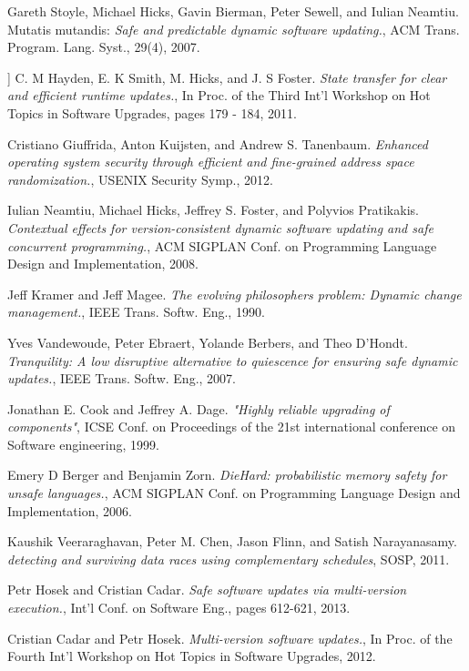 \documentclass[a4paper,11pt,twoside]{report}
\begin{document}
\begin{thebibliography}{1}
   Gareth Stoyle, Michael Hicks, Gavin Bierman, Peter Sewell, and Iulian Neamtiu. Mutatis mutandis: {\em Safe and predictable dynamic software updating.}, ACM Trans. Program. Lang. Syst., 29(4), 2007.
  
   ] C. M Hayden, E. K Smith, M. Hicks, and J. S Foster. {\em State transfer for clear and efficient runtime updates.}, In Proc. of the Third Int'l Workshop on Hot Topics in Software Upgrades, pages 179 - 184, 2011.

   Cristiano Giuffrida, Anton Kuijsten, and Andrew S. Tanenbaum. {\em Enhanced operating system security through efficient and fine-grained address space randomization.}, USENIX Security Symp., 2012.

   Iulian Neamtiu, Michael Hicks, Jeffrey S. Foster, and Polyvios Pratikakis. {\em Contextual effects for version-consistent dynamic software updating and safe concurrent programming.}, ACM SIGPLAN Conf. on Programming Language Design and Implementation, 2008. 

   Jeff Kramer and Jeff Magee. {\em The evolving philosophers problem: Dynamic change management.}, IEEE Trans. Softw. Eng., 1990. 

  Yves Vandewoude, Peter Ebraert, Yolande Berbers, and Theo D'Hondt. {\em Tranquility: A low disruptive alternative to quiescence for ensuring safe dynamic updates.}, IEEE Trans. Softw. Eng., 2007.

  Jonathan E. Cook and	Jeffrey A. Dage. {\em "Highly reliable upgrading of components"}, ICSE Conf. on Proceedings of the 21st international conference on Software engineering, 1999.

  Emery D Berger and Benjamin Zorn. {\em DieHard: probabilistic memory safety for unsafe languages.}, ACM SIGPLAN Conf. on Programming Language Design and Implementation, 2006.
 
  Kaushik Veeraraghavan, Peter M. Chen, Jason Flinn, and Satish Narayanasamy. {\em detecting and surviving data races using complementary schedules}, SOSP, 2011. 
 
  Petr Hosek and Cristian Cadar. {\em Safe software updates via multi-version execution.}, Int'l Conf. on Software Eng., pages 612-621, 2013.
 
  Cristian Cadar and Petr Hosek. {\em Multi-version software updates.}, In Proc. of the Fourth Int'l Workshop on Hot Topics in Software Upgrades, 2012.


\end{thebibliography}
\end{document}
